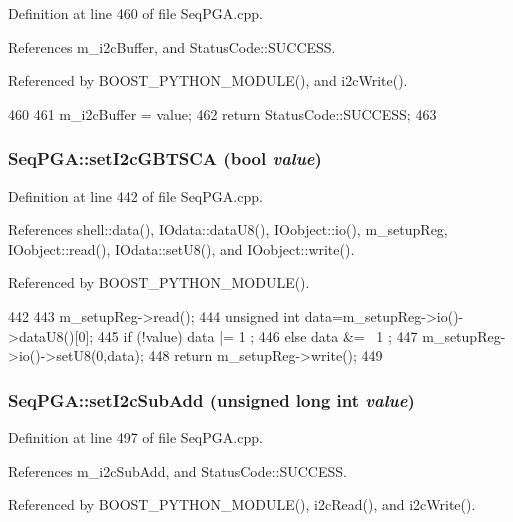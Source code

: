 Definition at line 460 of file SeqPGA.cpp.

References m\_\-i2cBuffer, and StatusCode::SUCCESS.

Referenced by BOOST\_\-PYTHON\_\-MODULE(), and i2cWrite().


\begin{DoxyCode}
460                                                         {
461   m_i2cBuffer = value;
462   return StatusCode::SUCCESS;
463 }
\end{DoxyCode}
\hypertarget{classSeqPGA_aef7911620b07d8aeef2a9ec95fa58ca4}{
\subsubsection[{setI2cGBTSCA}]{ SeqPGA::setI2cGBTSCA (bool {\em value})}}
\label{classSeqPGA_aef7911620b07d8aeef2a9ec95fa58ca4}


Definition at line 442 of file SeqPGA.cpp.

References shell::data(), IOdata::dataU8(), IOobject::io(), m\_\-setupReg, IOobject::read(), IOdata::setU8(), and IOobject::write().

Referenced by BOOST\_\-PYTHON\_\-MODULE().


\begin{DoxyCode}
442                                            {
443   m_setupReg->read();
444   unsigned int data=m_setupReg->io()->dataU8()[0];
445   if (!value) data |= 1  ;
446   else        data &= ~1 ;
447   m_setupReg->io()->setU8(0,data);
448   return m_setupReg->write();
449 }
\end{DoxyCode}
\hypertarget{classSeqPGA_a348c5d982223fb5cf2878e5bf3c6429c}{
\subsubsection[{setI2cSubAdd}]{ SeqPGA::setI2cSubAdd (unsigned long int {\em value})}}
\label{classSeqPGA_a348c5d982223fb5cf2878e5bf3c6429c}


Definition at line 497 of file SeqPGA.cpp.

References m\_\-i2cSubAdd, and StatusCode::SUCCESS.

Referenced by BOOST\_\-PYTHON\_\-MODULE(), i2cRead(), and i2cWrite().


